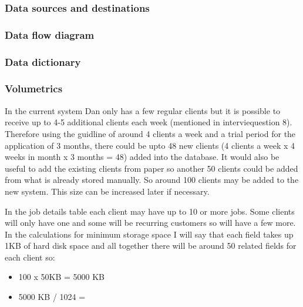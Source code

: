 \subsubsection{Data sources and destinations}



\subsubsection{Data flow diagram}



\subsubsection{Data dictionary}



\subsubsection{Volumetrics}

\begin{flushleft}

	In the current system Dan only has a few regular clients but it is possible to receive up to 4-5 additional clients each week (mentioned in interviequestion 8). Therefore using the guidline of around 4 clients a week and a trial period for the application of 3 months, there could be upto 48 new clients (4 clients a week x 4 weeks in month x 3 months = 48) added into the database. It would also be useful to add the existing clients from paper so another 50 clients could be added from what is already stored manually. So around 100 clients may be added to the new system. This size can be increased later if necessary. \par

In the job details table each client may have up to 10 or more jobs. Some clients will only have one and some will be recurring customers so will have a few more. In the calculations for minimum storage space I will say that each field takes up 1KB of hard disk space and all together there will be around 50 related fields for each client so:

\begin{itemize}
    \item 100 x 50KB = 5000 KB
	 \item 5000 KB / 1024 = 
\end{itemize}

\end{flushleft}




